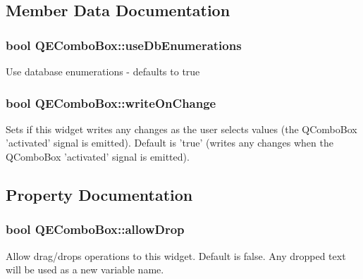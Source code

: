 \subsection{Member Data Documentation}
\hypertarget{classQEComboBox_a39bb3371e530bbf24ea08e4552e52495}{
\subsubsection[{useDbEnumerations}]{\setlength{\rightskip}{0pt plus 5cm}bool {\bf QEComboBox::useDbEnumerations}}}
\label{classQEComboBox_a39bb3371e530bbf24ea08e4552e52495}
Use database enumerations -\/ defaults to true \hypertarget{classQEComboBox_acb21edfaee598bab9e64ed24089187c7}{
\subsubsection[{writeOnChange}]{\setlength{\rightskip}{0pt plus 5cm}bool {\bf QEComboBox::writeOnChange}}}
\label{classQEComboBox_acb21edfaee598bab9e64ed24089187c7}
Sets if this widget writes any changes as the user selects values (the QComboBox 'activated' signal is emitted). Default is 'true' (writes any changes when the QComboBox 'activated' signal is emitted). 

\subsection{Property Documentation}
\hypertarget{classQEComboBox_ade82bed66e34eeda215eebdb8a394d96}{
\subsubsection[{allowDrop}]{\setlength{\rightskip}{0pt plus 5cm}bool QEComboBox::allowDrop}}
\label{classQEComboBox_ade82bed66e34eeda215eebdb8a394d96}
Allow drag/drops operations to this widget. Default is false. Any dropped text will be used as a new variable name. 

